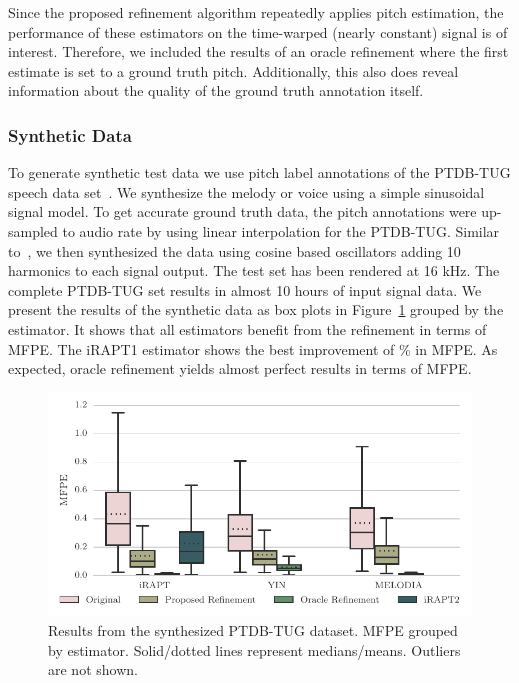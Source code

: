 Since the proposed refinement algorithm repeatedly applies pitch estimation, the performance of these estimators on the time-warped (nearly constant) signal is of interest. Therefore, we included the results of an oracle refinement where the first estimate is set to a ground truth pitch. Additionally, this also does reveal information about the quality of the ground truth annotation itself.

\subsubsection{Synthetic Data} %
\label{ssub:sythetic_data}

To generate synthetic test data we use pitch label annotations of the PTDB-TUG speech data set~\cite{pirker11}. We synthesize the melody or voice using a simple sinusoidal signal model. To get accurate ground truth data, the pitch annotations were up-sampled to audio rate by using linear interpolation for the PTDB-TUG. Similar to~\cite{mauch14}, we then synthesized the data using cosine based oscillators adding 10 harmonics to each signal output.
The test set has been rendered at 16 kHz. The complete PTDB-TUG set results in almost 10 hours of input signal data.
We present the results of the synthetic data as box plots in Figure~\ref{fig:ptdbtug_synth} grouped by the estimator. It shows that all estimators benefit from the refinement in terms of MFPE. The iRAPT1 estimator shows the best improvement of \ptdbtugsynthiRAPTIMPROMFPE \% in MFPE. As expected, oracle refinement yields almost perfect results in terms of MFPE.

\begin{figure}[t!]
\centering
  \includegraphics[width=0.90\columnwidth]{Chapters/05_Separation_Known/figures/stats_boxplot_ptdb_synth.pdf}
\caption{Results from the synthesized PTDB-TUG dataset. MFPE grouped by estimator. Solid/dotted lines represent medians/means. Outliers are not shown.}
\label{fig:ptdbtug_synth}
\end{figure}

